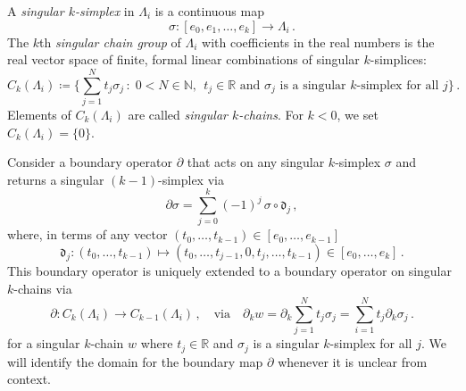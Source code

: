 \documentclass[11pt]{article}
\theoremstyle{plain}
\theoremstyle{definition}
\theoremstyle{remark}
\newcommand{\R}{\mathbb{R}}
\newcommand{\ST}{\Lambda}
\begin{document}
A \emph{singular \(k\)-simplex} in \(\ST_i\) is a continuous map
\[
    \sigma: [e_0,e_1,\dots,e_k] \longrightarrow \ST_i \, .
\]
The \(k\)th \emph{singular chain group} of \(\ST_i\) with coefficients in the real numbers is the real vector space of finite, formal linear combinations of singular \(k\)-simplices:
\[
C_k(\ST_i)
\coloneqq
\Bigg\{\sum_{j=1}^N t_j \sigma_j \, : \; 0 < N \in\mathbb{N},\   \ t_j\in\mathbb{R} \text{ and } \sigma_j \text{ is a singular \(k\)-simplex for all } j \Bigg\} \, .
\]
Elements of \(C_k(\ST_i)\) are called \emph{singular \(k\)-chains}. For \(k < 0\), we set \(C_k(\ST_i) = \{0\}\).

Consider a boundary operator \( \partial\) that acts on any singular \(k\)-simplex \(\sigma\) and returns a singular \((k-1)\)-simplex via
\[
 \partial \sigma
=\sum_{j=0}^k (-1)^j\, \sigma \circ \mathfrak{d}_j \, ,
\]
where, in terms of any vector \((t_0 , \dots, t_{k-1}) \in [e_0, \dots, e_{k-1}]\)
\[
    \mathfrak{d}_j : (t_0 , \dots, t_{k-1}) \mapsto (t_0 , \dots, t_{j-1}, 0, t_j , \dots,  t_{k-1}) \in  [e_0, \dots, e_{k}] \, .
\]
This boundary operator is uniquely extended to a boundary operator on singular \(k\)-chains via 
\[
\partial : C_k(\ST_i)\longrightarrow C_{k-1}(\ST_i) \, , \quad \text{via} \quad \partial_k w = \partial_k \sum_{j=1}^N t_j \sigma_j =  \sum_{i=1}^N t_j \partial_k \sigma_j \, .
\]
for a singular \(k\)-chain \(w \) where \(t_j \in \R\) and \(\sigma_j\) is a singular \(k\)-simplex for all \(j\). We will identify the domain for the boundary map \(\partial\) whenever it is unclear from context.
\end{document}
